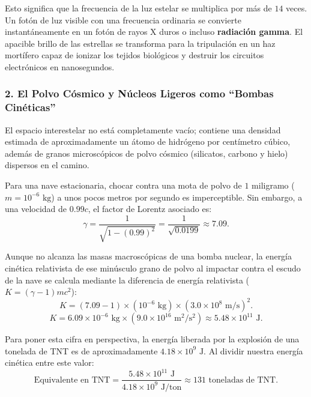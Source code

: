 \documentclass[11pt,a4paper]{book}
\begin{document}
Esto significa que la frecuencia de la luz estelar se multiplica por más de $14$ veces. Un fotón de luz visible con una frecuencia ordinaria se convierte instantáneamente en un fotón de rayos X duros o incluso \textbf{radiación gamma}. El apacible brillo de las estrellas se transforma para la tripulación en un haz mortífero capaz de ionizar los tejidos biológicos y destruir los circuitos electrónicos en nanosegundos.

\subsubsection{2. El Polvo Cósmico y Núcleos Ligeros como ``Bombas Cinéticas''}

El espacio interestelar no está completamente vacío; contiene una densidad estimada de aproximadamente un átomo de hidrógeno por centímetro cúbico, además de granos microscópicos de polvo cósmico (silicatos, carbono y hielo) dispersos en el camino.

Para una nave estacionaria, chocar contra una mota de polvo de $1$ miligramo ($m = 10^{-6} \text{ kg}$) a unos pocos metros por segundo es imperceptible. Sin embargo, a una velocidad de $0.99c$, el factor de Lorentz asociado es:
\begin{equation}
    \gamma = \frac{1}{\sqrt{1 - (0.99)^2}} = \frac{1}{\sqrt{0.0199}} \approx 7.09.
\end{equation}

Aunque no alcanza las masas macroscópicas de una bomba nuclear, la energía cinética relativista de ese minúsculo grano de polvo al impactar contra el escudo de la nave se calcula mediante la diferencia de energía relativista ($K = (\gamma - 1)mc^2$):
\begin{equation}
    K = (7.09 - 1) \times (10^{-6} \text{ kg}) \times (3.0 \times 10^8 \text{ m/s})^2.
\end{equation}
\begin{equation}
    K = 6.09 \times 10^{-6} \text{ kg} \times (9.0 \times 10^{16} \text{ m}^2/\text{s}^2) \approx 5.48 \times 10^{11} \text{ J}.
\end{equation}

Para poner esta cifra en perspectiva, la energía liberada por la explosión de una tonelada de TNT es de aproximadamente $4.18 \times 10^9 \text{ J}$. Al dividir nuestra energía cinética entre este valor:
\begin{equation}
    \text{Equivalente en TNT} = \frac{5.48 \times 10^{11} \text{ J}}{4.18 \times 10^9 \text{ J/ton}} \approx 131 \text{ toneladas de TNT}.
\end{equation}
\end{document}
